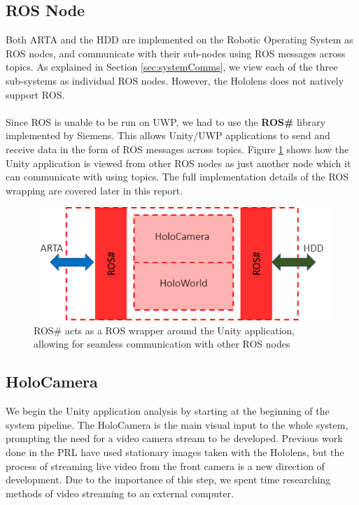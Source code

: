 \subsection{ROS Node}
Both ARTA and the HDD are implemented on the Robotic Operating System as ROS nodes, and communicate with their sub-nodes using ROS messages across topics. As explained in Section \ref{sec:systemComms}, we view each of the three sub-systems as individual ROS nodes. However, the Hololens does not natively support ROS.

\paragraph{} Since ROS is unable to be run on UWP, we had to use the \textbf{ROS\#} library implemented by Siemens. This allows Unity/UWP applications to send and receive data in the form of ROS messages across topics. Figure \ref{fig:holoROSWrapper} shows how the Unity application is viewed from other ROS nodes as just another node which it can communicate with using topics. The full implementation details of the ROS wrapping are covered later in this report. 

\begin{figure}[ht!]
	\centering
	\includegraphics[width=0.8\linewidth]{img/chapter4_analysis/holoROSSharpWrapper.png}
	\caption{ROS\# acts as a ROS wrapper around the Unity application, allowing for seamless communication with other ROS nodes}
	\label{fig:holoROSWrapper}
\end{figure}

\subsection{HoloCamera}
We begin the Unity application analysis by starting at the beginning of the system pipeline. The HoloCamera is the main visual input to the whole system, prompting the need for a video camera stream to be developed. Previous work done in the PRL have used stationary images taken with the Hololens, but the process of streaming live video from the front camera is a new direction of development. Due to the importance of this step, we spent time researching methods of video streaming to an external computer.

